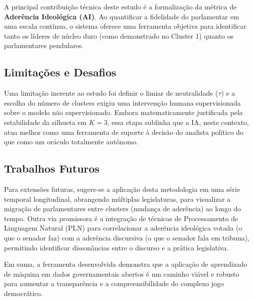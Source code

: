 \documentclass[conference]{IEEEtran}
\begin{document}
A principal contribuição técnica deste estudo é a formalização da métrica de \textbf{Aderência Ideológica (AI)}. Ao quantificar a fidelidade do parlamentar em uma escala contínua, o sistema oferece uma ferramenta objetiva para identificar tanto os líderes de núcleo duro (como demonstrado no Cluster 1) quanto os parlamentares pendulares.

\subsection{Limitações e Desafios}
Uma limitação inerente ao estudo foi definir o limiar de neutralidade ($\tau$) e a escolha do número de clusters exigiu uma intervenção humana supervisionada sobre o modelo não supervisionado. Embora matematicamente justificada pela estabilidade da silhueta em $K=3$, essa etapa sublinha que a IA, neste contexto, atua melhor como uma ferramenta de suporte à decisão do analista político do que como um oráculo totalmente autônomo.

\subsection{Trabalhos Futuros}
Para extensões futuras, sugere-se a aplicação desta metodologia em uma série temporal longitudinal, abrangendo múltiplas legislaturas, para visualizar a migração de parlamentares entre clusters (mudança de aderência) ao longo do tempo. Outra via promissora é a integração de técnicas de Processamento de Linguagem Natural (PLN) para correlacionar a aderência ideológica votada (o que o senador faz) com a aderência discursiva (o que o senador fala em tribuna), permitindo identificar dissonâncias entre o discurso e a prática legislativa.

Em suma, a ferramenta desenvolvida demonstra que a aplicação de aprendizado de máquina em dados governamentais abertos é um caminho viável e robusto para aumentar a transparência e a compreensibilidade do complexo jogo democrático.
\end{document}
